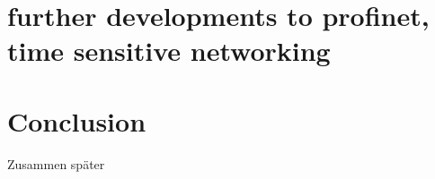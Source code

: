 \documentclass[conference]{IEEEtran}
\begin{document}
\section{further developments to profinet, time sensitive networking}
\section{Conclusion}

Zusammen später

\printbibliography
\end{document}
